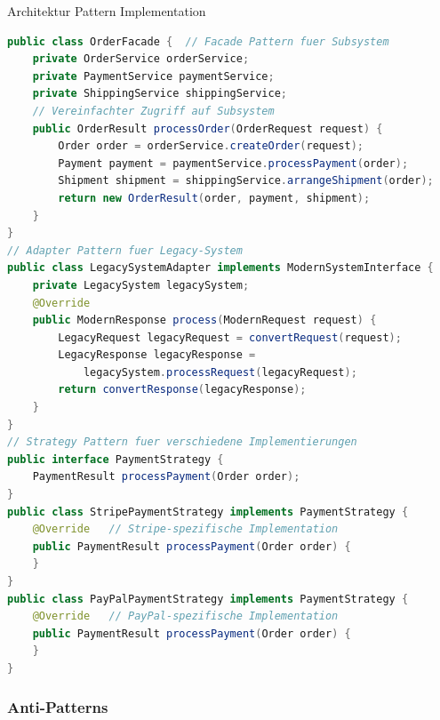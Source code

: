 \begin{example2}{Architektur Pattern Implementation}
\begin{lstlisting}[language=Java, style=basesmol]
public class OrderFacade {  // Facade Pattern fuer Subsystem
    private OrderService orderService;
    private PaymentService paymentService;
    private ShippingService shippingService;
    // Vereinfachter Zugriff auf Subsystem
    public OrderResult processOrder(OrderRequest request) { 
        Order order = orderService.createOrder(request);
        Payment payment = paymentService.processPayment(order);
        Shipment shipment = shippingService.arrangeShipment(order);
        return new OrderResult(order, payment, shipment);
    }
}
// Adapter Pattern fuer Legacy-System
public class LegacySystemAdapter implements ModernSystemInterface {
    private LegacySystem legacySystem;
    @Override
    public ModernResponse process(ModernRequest request) {
        LegacyRequest legacyRequest = convertRequest(request);
        LegacyResponse legacyResponse = 
            legacySystem.processRequest(legacyRequest);
        return convertResponse(legacyResponse);
    }
}
// Strategy Pattern fuer verschiedene Implementierungen
public interface PaymentStrategy {
    PaymentResult processPayment(Order order);
}
public class StripePaymentStrategy implements PaymentStrategy {
    @Override   // Stripe-spezifische Implementation
    public PaymentResult processPayment(Order order) {
    }
}
public class PayPalPaymentStrategy implements PaymentStrategy {
    @Override   // PayPal-spezifische Implementation
    public PaymentResult processPayment(Order order) {
    }
}
\end{lstlisting}
\end{example2}

\subsubsection{Anti-Patterns}

